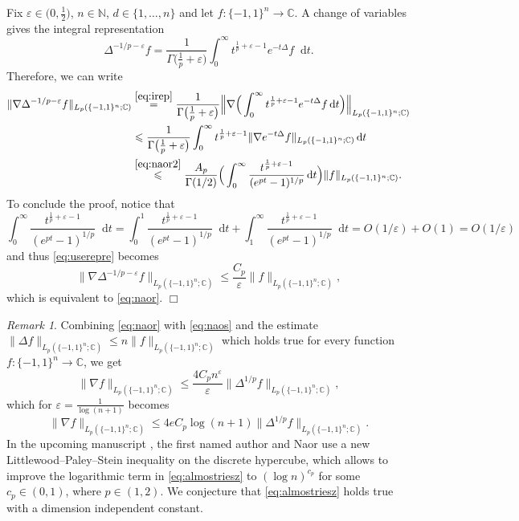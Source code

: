 \documentclass[11pt,reqno]{amsart}
\renewcommand{\leq}{\leqslant}
\newcommand{\e}{\varepsilon}
\newcommand{\1}{\mathbf 1}
\theoremstyle{remark}
\newtheorem{remark}[theorem]{Remark}
\newcommand{\C}{\mathbb C}
\newcommand{\N}{\mathbb N}
\newcommand*\diff{\mathop{}\!\mathrm{d}}
\begin{document}
Fix $\e\in\big(0,\frac{1}{2}\big)$, $n\in\N$, $d\in\{1,\ldots,n\}$ and let $f:\{-1,1\}^n\to\C$. A change of variables gives the integral representation
\begin{equation} \label{eq:irep}
\Delta^{-1/p-\e} f = \frac{1}{\Gamma\big(\frac{1}{p}+\e\big)} \int_0^\infty t^{\frac{1}{p}+\e-1} e^{-t\Delta} f \diff t.
\end{equation}
Therefore, we can write
\begin{equation} \label{eq:userepre}
\begin{split}
\|\nabla \Delta^{-1/p-\e}f\|_{L_p(\{-1,1\}^n;\C)}& \stackrel{\eqref{eq:irep}}{=} \frac{1}{\Gamma\big(\frac{1}{p}+\e\big)} \Big\| \nabla \Big( \int_0^\infty t^{\frac{1}{p}+\e-1} e^{-t\Delta} f \diff t\Big) \Big\|_{L_p(\{-1,1\}^n;\C)}
\\ & \leq \frac{1}{\Gamma\big(\frac{1}{p}+\e\big)} \int_0^\infty t^{\frac{1}{p}+\e-1} \|\nabla e^{-t\Delta} f\|_{L_p(\{-1,1\}^n;\C)} \diff t
\\ & \stackrel{\eqref{eq:naor2}}{\leq} \frac{A_p}{\Gamma(1/2)} \Big( \int_0^\infty \frac{t^{\frac{1}{p}+\e-1}}{(e^{pt}-1)^{1/p}} \diff t \Big) \|f\|_{L_p(\{-1,1\}^n;\C)}.
\end{split}
\end{equation}
To conclude the proof, notice that
\begin{equation}
\int_0^\infty \frac{t^{\frac{1}{p}+\e-1}}{(e^{pt}-1)^{1/p}} \diff t  = \int_0^1 \frac{t^{\frac{1}{p}+\e-1}}{(e^{pt}-1)^{1/p}} \diff t  + \int_1^\infty \frac{t^{\frac{1}{p}+\e-1}}{(e^{pt}-1)^{1/p}} \diff t  = O(1/\e) + O(1)= O(1/\e)
\end{equation}
and thus \eqref{eq:userepre} becomes
\begin{equation}
\|\nabla \Delta^{-1/p-\e}f\|_{L_p(\{-1,1\}^n;\C)} \leq \frac{C_p}{\e}  \|f\|_{L_p(\{-1,1\}^n;\C)},
\end{equation}
which is equivalent to \eqref{eq:naor}.
\hfill$\Box$ 

\begin{remark}
Combining \eqref{eq:naor} with \eqref{eq:naos} and the estimate $\|\Delta f\|_{L_p(\{-1,1\}^n;\C)} \leq n\|f\|_{L_p(\{-1,1\}^n;\C)}$ which holds true for every function $f:\{-1,1\}^n\to\C$, we get 
\begin{equation}
\|\nabla f\|_{L_p(\{-1,1\}^n;\C)} \leq \frac{4C_p n^{\e}}{\e} \|\Delta^{1/p}f\|_{L_p(\{-1,1\}^n;\C)},
\end{equation}
which for $\e=\frac{1}{\log (n+1)}$ becomes
\begin{equation} \label{eq:almostriesz}
\|\nabla f\|_{L_p(\{-1,1\}^n;\C)} \leq 4eC_p \log (n+1) \|\Delta^{1/p}f\|_{L_p(\{-1,1\}^n;\C)}.
\end{equation}
In the upcoming manuscript \cite{EN20}, the first named author and Naor use a new Littlewood--Paley--Stein inequality \cite{Ste70} on the discrete hypercube, which allows to improve the logarithmic term in \eqref{eq:almostriesz} to $(\log n)^{c_p}$ for some $c_p\in(0,1)$, where $p\in(1,2)$. We conjecture that \eqref{eq:almostriesz} holds true with a dimension independent constant.
\end{remark}
\end{document}
